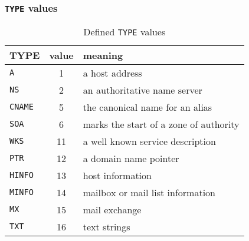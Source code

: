 \subsubsection{\texttt{TYPE} values}
\label{sec:rr-types}
\begin{table}[h]
  \centering
  \begin{tabularx}{0.8\linewidth}{scX}
    TYPE& value & meaning \\[2pt]
    \hline
    \texttt{A} & 1 & a host address \\
    \texttt{NS} & 2 & an authoritative name server \\
    \texttt{CNAME} & 5 & the canonical name for an alias \\
    \texttt{SOA} & 6 & marks the start of a zone of authority \\
    \texttt{WKS} & 11 & a well known service description \\
    \texttt{PTR} & 12 & a domain name pointer \\
    \texttt{HINFO} & 13 & host information \\
    \texttt{MINFO} & 14 & mailbox or mail list information \\
    \texttt{MX} & 15 & mail exchange \\
    \texttt{TXT} & 16 & text strings \\
  \end{tabularx}
  \caption{Defined \texttt{TYPE} values}
  \label{tab:rr-types}
\end{table}

